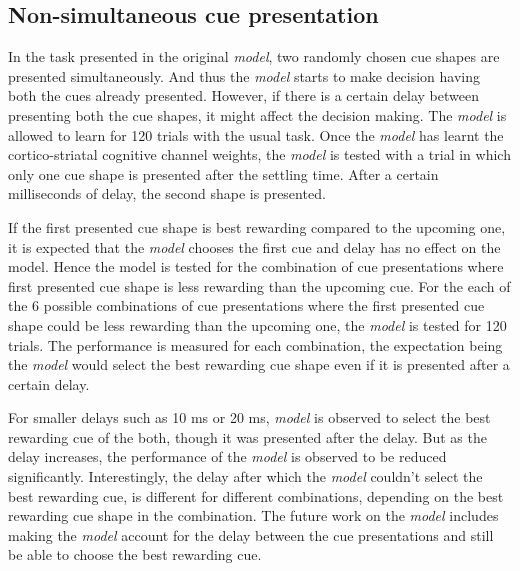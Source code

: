 \documentclass[11pt]{article}
\begin{document}
\subsection{Non-simultaneous cue presentation}
In the task presented in the original \emph{model}, two randomly chosen cue shapes are presented simultaneously. And thus the \emph{model} starts to make decision having both the cues already presented. However, if there is a certain delay between presenting both the cue shapes, it might affect the decision making. The \emph{model} is allowed to learn for 120 trials with the usual task. Once the \emph{model} has learnt the cortico-striatal cognitive channel weights, the \emph{model} is tested with a trial in which only one cue shape is presented after the settling time. After a certain milliseconds of delay, the second shape is presented. \par
If the first presented cue shape is best rewarding compared to the upcoming one, it is expected that the \emph{model} chooses the first cue and delay has no effect on the model. Hence the model is tested for the combination of cue presentations where first presented cue shape is less rewarding than the upcoming cue. For the each of the 6 possible combinations of cue presentations where the first presented cue shape could be less rewarding than the upcoming one, the \emph{model} is tested for 120 trials. The performance is measured for each combination, the expectation being the \emph{model} would select the best rewarding cue shape even if it is presented after a certain delay.\par
 For smaller delays such as 10 ms or 20 ms, \emph{model} is observed to select the best rewarding cue of the both, though it was presented after the delay. But as the delay increases, the performance of the \emph{model} is observed to be reduced significantly. Interestingly, the delay after which the \emph{model} couldn't select the best rewarding cue, is different for different combinations, depending on the best rewarding cue shape in the combination. The future work on the \emph{model} includes making the \emph{model} account for the delay between the cue presentations and still be able to choose the best rewarding cue.       
\end{document}

